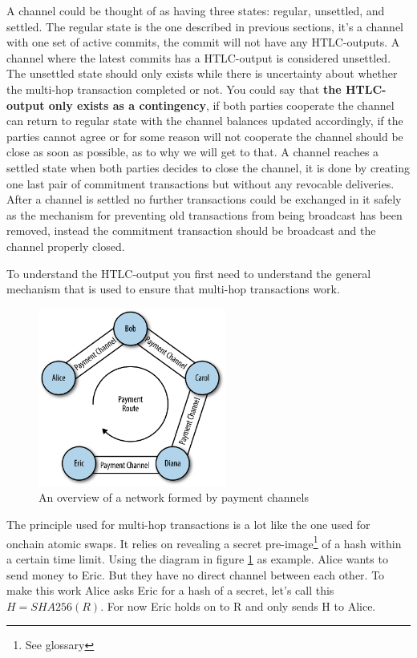A channel could be thought of as having three states: regular, unsettled, and settled. The regular state is the one described in previous sections, it's a channel with one set of active commits, the commit will not have any HTLC-outputs. A channel where the latest commits has a HTLC-output is considered unsettled. The unsettled state should only exists while there is uncertainty about whether the multi-hop transaction completed or not. You could say that \textbf{the HTLC-output only exists as a contingency}, if both parties cooperate the channel can return to regular state with the channel balances updated accordingly, if the parties cannot agree or for some reason will not cooperate the channel should be close as soon as possible, as to why we will get to that. A channel reaches a settled state when both parties decides to close the channel, it is done by creating one last pair of commitment transactions but without any revocable deliveries. After a channel is settled no further transactions could be exchanged in it safely as the mechanism for preventing old transactions from being broadcast has been removed, instead the commitment transaction should be broadcast and the channel properly closed.

To understand the HTLC-output you first need to understand the general mechanism that is used to ensure that multi-hop transactions work. 

\begin{figure}[H]
	\centering
	\includegraphics[width=0.55\textwidth]{background/images/pc_route.png}
	\caption{An overview of a network formed by payment channels}
	\label{fig:pc-route}
\end{figure}

The principle used for multi-hop transactions is a lot like the one used for onchain atomic swaps. It relies on revealing a secret pre-image\footnote{See glossary} of a hash within a certain time limit. Using the diagram in figure \ref{fig:pc-route} as example. Alice wants to send money to Eric. But they have no direct channel between each other. To make this work Alice asks Eric for a hash of a secret, let's call this $H = SHA256(R)$. For now Eric holds on to R and only sends H to Alice.

